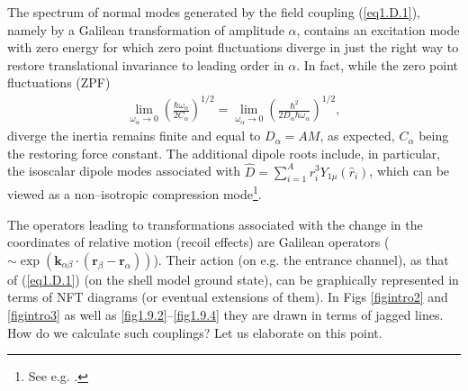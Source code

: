 \begin{subappendices}
The spectrum  of normal modes generated by the field coupling (\ref{eq1.D.1}), namely by a Galilean transformation of amplitude $\alpha$, contains an excitation mode with zero energy for which zero point fluctuations diverge in just the right way to restore translational invariance to leading order in $\alpha$. In fact, while the zero point fluctuations (ZPF)
\begin{align}\label{eq1.D.4}
\lim_{\omega_\alpha\to 0}\left(\frac{\hbar\omega_\alpha}{2C_\alpha}\right)^{1/2}=\lim_{\omega_\alpha\rightarrow 0}\left(\frac{\hbar^2}{2D_\alpha\hbar\omega_\alpha}\right)^{1/2},
\end{align}
diverge the inertia remains finite and equal to $D_\alpha=AM$, as expected, $C_\alpha$ being the restoring force constant.
The additional dipole roots include, in particular, the isoscalar dipole modes associated with $\hat D=\sum_{i=1}^{A}r^3_iY_{1\mu}(\hat r_i)$, which can be viewed as a non--isotropic compression mode\footnote{See e.g. \cite{Colo:00}.}.

The operators leading to transformations associated with the change in the coordinates of relative motion (recoil effects) are Galilean operators ($\sim\exp\left(\mathbf k_{\alpha\beta}\cdot(\mathbf r_\beta-\mathbf{r}_\alpha)\right)$). Their action (on e.g. the entrance channel), as that of (\ref{eq1.D.1}) (on the shell model ground state), can be graphically represented in terms of NFT diagrams (or eventual extensions of them). In Figs \ref{figintro2} and \ref{figintro3} as well as \ref{fig1.9.2}--\ref{fig1.9.4}  they are drawn in terms of jagged lines. How do we calculate such couplings? Let us elaborate  on this point.



\end{subappendices}
